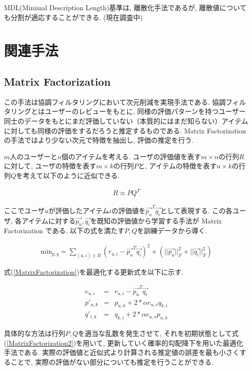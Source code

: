 \documentclass[a4j,12pt]{jarticle}
\begin{document}
MDL(Minimal Description Length)基準は, 離散化手法であるが, 離散値についても分割が適応することができる. (現在調査中)

\section{関連手法}

\subsection{Matrix Factorization}

この手法は協調フィルタリングにおいて次元削減を実現手法である. 協調フィルタリングとはユーザーのレビューをもとに, 同様の評価パターンを持つユーザー同士のデータをもとにまだ評価していない（本質的にはまだ知らない）アイテムに対しても同様の評価をするだろうと推定するものである. Matrix Factorization の手法ではより少ない次元で特徴を抽出し, 評価の推定を行う.~\cite{Koren}

$m$人のユーザーと$n$個のアイテムを考える. ユーザの評価値を表す$m \times n$の行列$R$に対して, ユーザの特徴を表す$m \times k$の行列$P$と, アイテムの特徴を表す$n \times k$の行列$Q$を考えて以下のように近似できる.

\begin{eqnarray}
R \approx P  Q^T
\end{eqnarray}

ここでユーザ$u$が評価したアイテム$i$の評価値を$\vec{p_u}^T \vec{q_i}$として表現する. この各ユーザ, 各アイテムに対する$\vec{p_u}, \vec{q_i}$を既知の評価値から学習する手法が Matrix Factorization である. 以下の式を満たす$P, Q$を訓練データから導く.

\begin{eqnarray}
\label{MatrixFactorization}
\mbox{min}_{p,q} = \sum_{(u, i) \in R} (r_{u, i} - \vec{p_u}^T \vec{q_i})^2 + (||\vec{p_u}||^2_F + ||\vec{q_i}||^2_F)
\end{eqnarray}

式(\ref{MatrixFactorization})を最適化する更新式を以下に示す.

\begin{eqnarray}
\label{MatrixFactorization2}
e_{u, i} &=& r_{u, i} - \vec{p_u}^T \vec{q_i} \\
p'_{u, k} &=& p_{u, k} + 2 * \alpha e_{u, v} q_{k, i} \\
q'_{i, k} &=& q_{k, i} + 2 * \alpha e_{u, v} p_{u, k}
\end{eqnarray}

具体的な方法は行列$P,Q$を適当な乱数を発生させて, それを初期状態として式(\ref{MatrixFactorization2})を用いて, 更新していく確率的勾配降下を用いた最適化手法である. 実際の評価値と近似式より計算される推定値の誤差を最も小さくすることで, 実際の評価がない部分についても推定を行うことができる.
\end{document}

